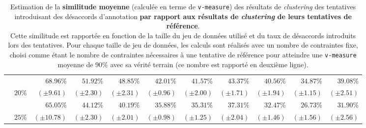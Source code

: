 \begin{table}[!htb]
\begin{center}
{\begin{tabular}{|c|c||r|r|r|r|r|r|r|r|r|}
						\cellcolor{colorTableHeader!15}
							& \cellcolor{colorTableHeader!15}
							& $68.96$\%
							& $51.92$\%
							& $48.85$\%
							& $42.01$\%
							& $41.57$\%
							& $43.37$\%
							& $40.56$\%
							& $34.87$\%
							& $39.08$\%
							\tabularnewline
						\cellcolor{colorTableHeader!15}
							& \multirow{-2}{*}{
								\cellcolor{colorTableHeader!15}
								$20$\%
							}
							& \footnotesize $(\pm9.61)$
							& \footnotesize $(\pm2.30)$
							& \footnotesize $(\pm2.31)$
							& \footnotesize $(\pm0.96)$
							& \footnotesize $(\pm2.00)$
							& \footnotesize $(\pm1.71)$
							& \footnotesize $(\pm1.94)$
							& \footnotesize $(\pm1.15)$
							& \footnotesize $(\pm2.51)$
							\tabularnewline
							\hhline{~----------}
						
						\cellcolor{colorTableHeader!15}
							& \cellcolor{colorTableHeader!15}
							& $65.05$\%
							& $44.12$\%
							& $40.19$\%
							& $35.88$\%
							& $35.31$\%
							& $37.31$\%
							& $32.47$\%
							& $26.73$\%
							& $31.90$\%
							\tabularnewline
						\multirow{-12}{*}{
							\cellcolor{colorTableHeader!15}
							\rotatebox[origin=c]{90}{Taux de désaccords simulés}
						}
							& \multirow{-2}{*}{
								\cellcolor{colorTableHeader!15}
								$25$\%
							}
							& \footnotesize $(\pm10.78)$
							& \footnotesize $(\pm2.30)$
							& \footnotesize $(\pm2.01)$
							& \footnotesize $(\pm0.98)$
							& \footnotesize $(\pm1.25)$
							& \footnotesize $(\pm2.04)$
							& \footnotesize $(\pm1.46)$
							& \footnotesize $(\pm1.56)$
							& \footnotesize $(\pm2.56)$
							\tabularnewline
							\hline
						
					\end{tabular}
				}
				\end{center}
				\caption{
					Estimation de la \textbf{similitude moyenne} (calculée en terme de \texttt{v-measure}) des résultats de \textit{clustering} des tentatives introduisant des désaccords d'annotation \textbf{par rapport aux résultats de \textit{clustering} de leurs tentatives de référence}. \\
					Cette similitude est rapportée en fonction de la taille du jeu de données utilisé et du taux de désaccords introduits lors des tentatives.
					Pour chaque taille de jeu de données, les calculs sont réalisés avec un nombre de contraintes fixe, choisi comme étant le nombre de contraintes nécessaires à une tentative de référence pour atteindre une \texttt{v-measure} moyenne de $90$\% avec sa vérité terrain (ce nombre est rapporté en deuxième ligne).
				}
				\label{table:4.6.3-ETUDE-ROBUSTESSE-SUBJECTIVITE-ANNOTATION-ET-DIVERGENCE-CLUSTERING}
			\end{table}

